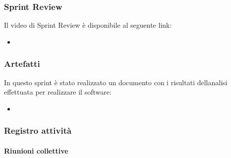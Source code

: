 \documentclass[letterpaper,10pt,italian]{sphinxmanual}
\begin{document}
\subsubsection{Sprint Review}
\label{\detokenize{development/sprint0/index:sprint-review}}
\sphinxAtStartPar
Il video di Sprint Review è disponibile al seguente link:
\begin{itemize}
\item {} 
\sphinxAtStartPar
{}

\end{itemize}


\subsubsection{Artefatti}
\label{\detokenize{development/sprint0/index:artefatti}}
\sphinxAtStartPar
In questo sprint è stato realizzato un documento con i risultati dell\textquotesingle{}analisi effettuata per realizzare il software:
\begin{itemize}
\item {} 
\sphinxAtStartPar
{}

\end{itemize}


\subsubsection{Registro attività}
\label{\detokenize{development/sprint0/index:registro-attivita}}

\paragraph{Riunioni collettive}
\label{\detokenize{development/sprint0/index:riunioni-collettive}}
\end{document}
